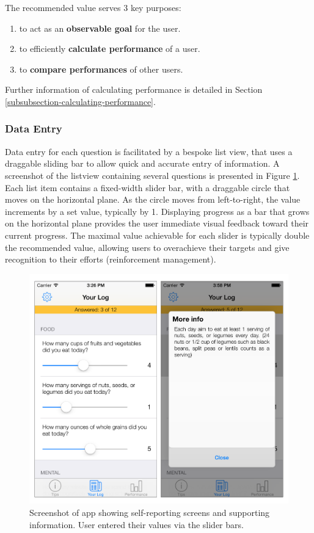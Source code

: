 The recommended value serves 3 key purposes:
\begin{enumerate}[noitemsep,topsep=0pt]
\item to act as an \textbf{observable goal} for the user.
\item to efficiently \textbf{calculate performance} of a user.
\item to \textbf{compare performances} of other users.
\end{enumerate}

Further information of calculating performance is detailed in Section \ref{subsubsection-calculating-performance}.

\subsubsection{Data Entry}
Data entry for each question is facilitated by a bespoke list view, that uses a draggable sliding bar to allow quick and accurate entry of information. A screenshot of the listview containing several questions is presented in Figure \ref{fig: screenshot-measure}. Each list item contains a fixed-width slider bar, with a draggable circle that moves on the horizontal plane. As the circle moves from left-to-right, the value increments by a set value, typically by 1. Displaying progress as a bar that grows on the horizontal plane provides the user immediate visual feedback toward their current progress. The maximal value achievable for each slider is typically double the recommended value, allowing users to overachieve their targets and give recognition to their efforts (reinforcement management).

\begin{figure}[h]
    \centering
    \includegraphics[scale=0.25, angle=0]{Files/prevention-study-1/figures/screenshot-measure.png}
    \caption{Screenshot of app showing self-reporting screens and supporting information. User entered their values via the slider bars.}
    \label{fig: screenshot-measure}
\end{figure}

